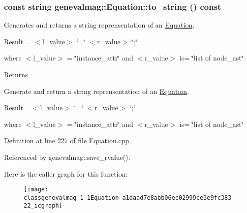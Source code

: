 \hypertarget{classgenevalmag_1_1Equation_a1daad7e8abb06ec02999ce3e9fc38322}{
\subsubsection[{to\_\-string}]{\setlength{\rightskip}{0pt plus 5cm}const string genevalmag::Equation::to\_\-string () const}}
\label{classgenevalmag_1_1Equation_a1daad7e8abb06ec02999ce3e9fc38322}
Generates and returns a string reprensentation of an \hyperlink{classgenevalmag_1_1Equation}{Equation}.\par
 \par
 Result = $<$l\_\-value$>$ \char`\"{}=\char`\"{} $<$r\_\-value$>$ \char`\"{};\char`\"{}\par
 \par
 where $<$l\_\-value$>$ = \char`\"{}instance\_\-attr\char`\"{} and $<$r\_\-value$>$ is= \char`\"{}list of node\_\-ast\char`\"{}\par


\begin{DoxyReturn}{Returns}

\end{DoxyReturn}
Generate and return a string reprensentation of an \hyperlink{classgenevalmag_1_1Equation}{Equation}.

Result= $<$l\_\-value$>$ \char`\"{}=\char`\"{} $<$r\_\-value$>$ \char`\"{};\char`\"{}

where $<$l\_\-value$>$ = \char`\"{}instance\_\-attr\char`\"{} and $<$r\_\-value$>$ is= \char`\"{}list of node\_\-ast\char`\"{} 

Definition at line 227 of file Equation.cpp.



Referenced by genevalmag::save\_\-rvalue().



Here is the caller graph for this function:\nopagebreak
\begin{figure}[H]
\begin{center}
\leavevmode
\texttt{[image: classgenevalmag\_1\_1Equation\_a1daad7e8abb06ec02999ce3e9fc38322\_icgraph]}
\end{center}
\end{figure}




